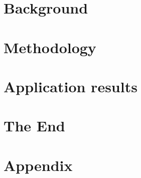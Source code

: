 \documentclass[oneside,openright,titlepage,numbers=noenddot,headinclude,%
                footinclude=true,cleardoublepage=empty,abstract=on,%
                paper=a4,fontsize=11pt]{scrreprt}
\begin{document}
\frenchspacing
\raggedbottom
{}
\pagestyle{plain}


\cleardoublepage
\cleardoublepage
\cleardoublepage
\cleardoublepage

\cleardoublepage
\pagestyle{scrheadings}

\cleardoublepage
\part{Background}\label{pt:part1}
\cleardoublepage

\part{Methodology}\label{pt:part2}
\cleardoublepage
\cleardoublepage

\part{Application results}\label{pt:part3}
\cleardoublepage
\cleardoublepage
\cleardoublepage
\cleardoublepage
\cleardoublepage

\part{The End}\label{pt:part4}
\cleardoublepage

\appendix
\cleardoublepage
\part{Appendix}\label{pt:part5}
\cleardoublepage



\end{document}
